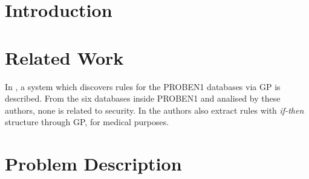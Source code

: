 \documentclass[runningheads,a4paper]{llncs}
\begin{document}
\section{Introduction}
\label{sec:intro}


\section{Related Work}
\label{sec:SotA}


In \cite{DeFalco2002257}, a system which discovers rules for the PROBEN1 databases via GP is described. From the six databases inside PROBEN1 and analised by these authors, none is related to security.
In \cite{Tsakonas2004195} the authors also extract rules with \textit{if-then} structure through GP, for medical purposes.

\section{Problem Description}
\label{sec:problem}
\end{document}

